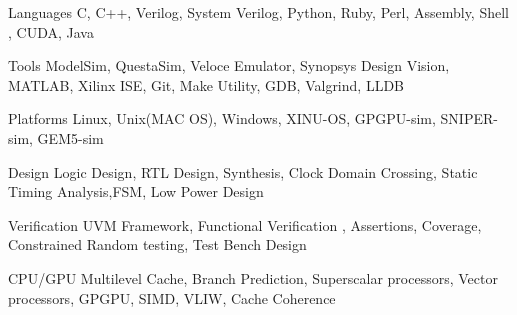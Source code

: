 

\begin{cvskills}

  \cvskill
    {Languages} %
    {C, C++, Verilog, System Verilog, Python, Ruby, Perl, Assembly, Shell , CUDA, Java} %

  \cvskill
    {Tools} %
    {ModelSim, QuestaSim, Veloce Emulator, Synopsys Design Vision, MATLAB, Xilinx ISE, Git, Make Utility, GDB, Valgrind, LLDB} %

    \cvskill
    {Platforms} %
    {Linux, Unix(MAC OS), Windows, XINU-OS, GPGPU-sim, SNIPER-sim, GEM5-sim} %

  \cvskill
    {Design} %
    { Logic Design, RTL Design, Synthesis, Clock Domain Crossing, Static Timing Analysis,FSM, Low Power Design} %

  \cvskill
    {Verification} %
    {UVM Framework, Functional Verification , Assertions, Coverage, Constrained Random testing, Test Bench Design} %

  \cvskill
    {CPU/GPU} %
    {Multilevel Cache, Branch Prediction, Superscalar processors, Vector processors, GPGPU, SIMD, VLIW, Cache Coherence} %

  

\end{cvskills}
